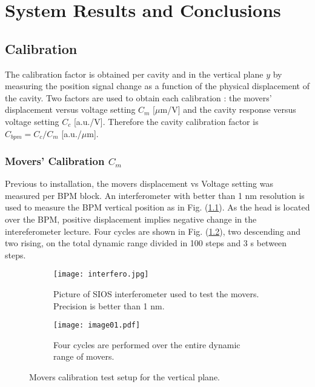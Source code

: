 \chapter{System Results and Conclusions}
\section{Calibration}\label{s:cals}
The calibration factor is obtained per cavity and in the vertical plane $y$ by measuring the position signal change as a function of the physical displacement of the cavity. Two factors are used to obtain each calibration : the movers' displacement versus voltage setting $C_m$ [$\mu$m/V] and the cavity response versus voltage setting $C_c$ [a.u./V]. Therefore the cavity calibration factor is $C_{bpm}=C_c/C_m$ [a.u./$\mu$m].\par
\subsection{Movers' Calibration $C_m$}\label{s:calcm}
Previous to installation, the movers displacement vs Voltage setting was measured per BPM block. An interferometer with better than 1 nm resolution is used to measure the BPM vertical position as in Fig. (\ref{f:interfero}). As the head is located over the BPM, positive displacement implies negative change in the intereferometer lecture. Four cycles are shown in Fig. (\ref{f:fourcycles}), two descending and two rising, on the total dynamic range divided in 100 steps and 3 s between steps.\par
\begin{figure}[!htb]
\centering
\begin{subfigure}[b]{0.3\textwidth}
\texttt{[image: interfero.jpg]}\caption{Picture of SIOS interferometer used to test the movers. Precision is better than 1 nm.}\label{f:interfero}
\end{subfigure}\hspace*{1cm}
\begin{subfigure}[b]{0.5\textwidth}
\texttt{[image: image01.pdf]}\caption{Four cycles are performed over the entire dynamic range of movers.}\label{f:fourcycles}
\end{subfigure}\caption{Movers calibration test setup for the vertical plane.}\label{f:cmtest}
\end{figure}
